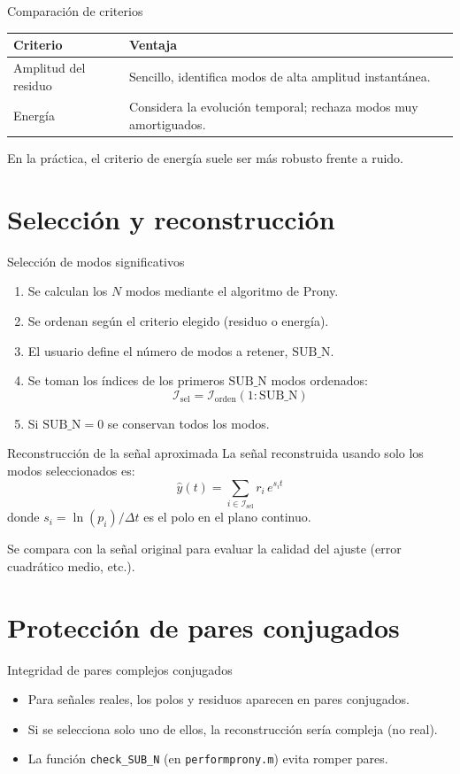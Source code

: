 {Comparación de criterios}
\begin{center}
\begin{tabular}{|l|p{5cm}|}
\hline
\textbf{Criterio} & \textbf{Ventaja} \\
\hline
Amplitud del residuo & Sencillo, identifica modos de alta amplitud instantánea. \\
\hline
Energía & Considera la evolución temporal; rechaza modos muy amortiguados. \\
\hline
\end{tabular}
\end{center}

En la práctica, el criterio de energía suele ser más robusto frente a ruido.

\section{Selección y reconstrucción}

{Selección de modos significativos}
\begin{enumerate}
  \item Se calculan los \(N\) modos mediante el algoritmo de Prony.
  \item Se ordenan según el criterio elegido (residuo o energía).
  \item El usuario define el número de modos a retener, \(\text{SUB\_N}\).
  \item Se toman los índices de los primeros \(\text{SUB\_N}\) modos ordenados:
  \[
  \mathcal{I}_{\text{sel}} = \mathcal{I}_{\text{orden}}(1:\text{SUB\_N})
  \]
  \item Si \(\text{SUB\_N}=0\) se conservan todos los modos.
\end{enumerate}

{Reconstrucción de la señal aproximada}
La señal reconstruida usando solo los modos seleccionados es:
\[
\hat{y}(t) = \sum_{i \in \mathcal{I}_{\text{sel}}} r_i \, e^{s_i t}
\]
donde \(s_i = \ln(p_i)/\Delta t\) es el polo en el plano continuo.

Se compara con la señal original para evaluar la calidad del ajuste (error cuadrático medio, etc.).

\section{Protección de pares conjugados}

{Integridad de pares complejos conjugados}
\begin{itemize}
  \item Para señales reales, los polos y residuos aparecen en pares conjugados.
  \item Si se selecciona solo uno de ellos, la reconstrucción sería compleja (no real).
  \item La función \texttt{check\_SUB\_N} (en \texttt{performprony.m}) evita romper pares.
\end{itemize}

